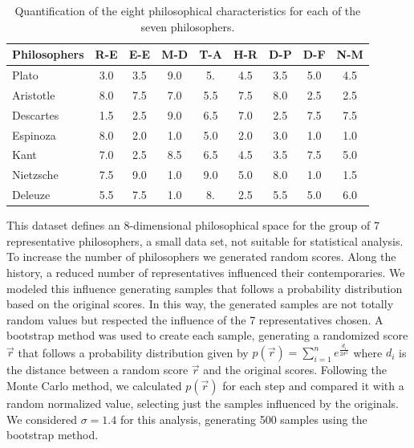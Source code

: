 \documentclass[%
 aip,
 jmp,%
 amsmath,amssymb,
 reprint,%
]{revtex4-1}
\begin{document}
\begin{table}%
\caption{\label{tab:tableA}Quantification of the
eight philosophical characteristics for each of the seven philosophers.  }

\begin{ruledtabular}
\begin{tabular}{|l||c|c|c|c|c|c|c|c|}

Philosophers & R-E & E-E & M-D & T-A & H-R & D-P & D-F & N-M \\ \hline

Plato  & 3.0 &   3.5 &   9.0  &   5.  &   4.5 &   3.5 &   5.0 &   4.5 \\

Aristotle & 8.0 &   7.5 &   7.0  &   5.5 &   7.5 &   8.0 &   2.5 &   2.5 \\

Descartes & 1.5 &   2.5 &   9.0  &   6.5 &   7.0 &   2.5 &   7.5 &   7.5 \\

Espinoza     & 8.0 &   2.0 &   1.0  &   5.0 &   2.0 &   3.0 &   1.0 &   1.0 \\

Kant      & 7.0 &   2.5 &   8.5  &   6.5 &   4.5 &   3.5 &   7.5 &   5.0 \\

Nietzsche & 7.5 &   9.0 &   1.0  &   9.0 &   5.0 &   8.0 &   1.0 &   1.5 \\

Deleuze   & 5.5 &   7.5 &   1.0  &   8.  &   2.5 &   5.5 &   5.0 &   6.0 \\
\end{tabular}
\end{ruledtabular}
\end{table}

This dataset defines an 8-dimensional philosophical space for the
group of 7 representative philosophers, a small data set, not suitable
for statistical analysis.
To increase the number of philosophers we generated
random scores. Along the history, a reduced
number of representatives influenced their contemporaries. We modeled
this influence generating samples that follows a probability
distribution based on the original scores. In this way, the generated
samples are not totally random values but respected the influence of the 7
representatives chosen.
A bootstrap method was used to create each sample, generating a
randomized score $\vec{r}$ that follows a probability distribution
given by $p(\vec{r}) = \sum^n_{i=1} e^{\frac{d_i}{2\sigma^2}}$ where
$d_i$ is the distance between a random score $\vec{r}$ and the
original scores.
Following the Monte Carlo method, we calculated $p(\vec{r})$ for each step
and compared it with a random normalized value, selecting just the
samples influenced by the originals. We considered $\sigma =
1.4$ for this analysis, generating 500 samples using the bootstrap method.
\end{document}
